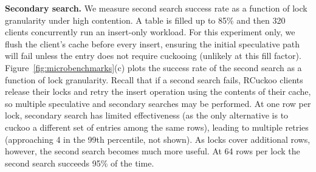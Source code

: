 



\textbf{Secondary search.}
We measure second search success rate as a function of lock granularity under high contention.  A
table is filled up to 85\% and then 320 clients concurrently run an insert-only workload.  For this
experiment only, we flush the client's cache before every insert, ensuring the initial speculative
path will fail unless the entry does not require cuckooing (unlikely at this fill factor).
Figure~\ref{fig:microbenchmarks}(c) plots the success rate of the second search as a function of
lock granularity.   Recall that if a second search
fails, RCuckoo clients release their locks and retry the insert operation using the contents of
their cache, so multiple speculative and secondary searches may be performed.  At one row per lock,
secondary search has limited effectiveness (as the only alternative is to cuckoo a different set of
entries among the same rows), leading to multiple retries (approaching 4 in the 99th percentile, not
shown).  As locks cover additional rows, however, the second search becomes much more
useful.
At 64 rows per lock the second search succeeds 95\% of the time.


